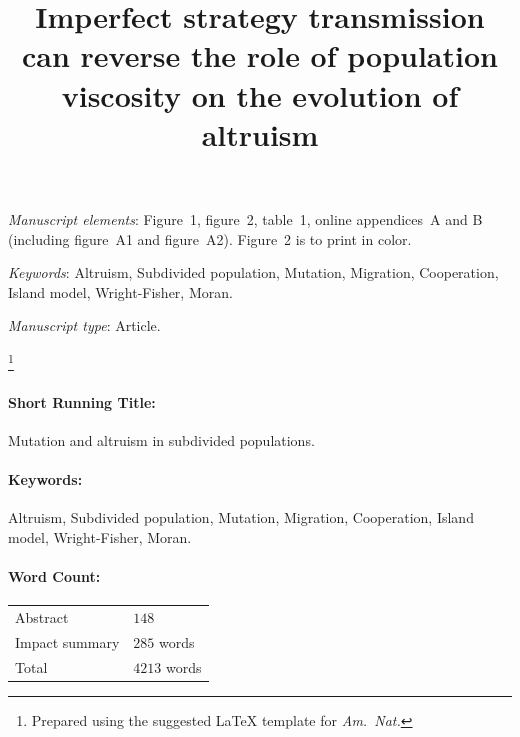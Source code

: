 \documentclass[11pt, letterpaper]{article}
\title{\Large Imperfect strategy transmission can reverse the role of population viscosity on the evolution of altruism}
\date{}
\author{}
\newcommand\blfootnote[1]{%
  \begingroup
  \renewcommand\thefootnote{}\footnote{#1}%
  \addtocounter{footnote}{-1}%
  \endgroup
}
\begin{document}
\pagestyle{maintext}


\maketitle


\bigskip

\textit{Manuscript elements}: Figure~1, figure~2, table~1, online appendices~A and B (including figure~A1 and figure~A2). Figure~2 is to print in color.

\bigskip

\textit{Keywords}: Altruism, Subdivided population, Mutation, Migration, Cooperation, Island model, Wright-Fisher, Moran.

\bigskip

\textit{Manuscript type}: Article. %

\bigskip

\blfootnote{Prepared using the suggested \LaTeX{} template for \textit{Am.\ Nat.}}

\paragraph{Short Running Title:} Mutation and altruism in subdivided populations.

\paragraph{Keywords:} Altruism, Subdivided population, Mutation, Migration, Cooperation, Island model, Wright-Fisher, Moran.

\paragraph{Word Count:}
\begin{tabular}[t]{ll}
Abstract & $148$ \\
Impact summary & $285$ words \\
Total & $4213$ words
\end{tabular}

\end{document}

